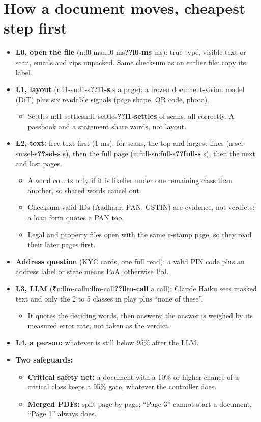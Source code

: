\documentclass[9pt]{extarticle}
\newcommand\N[1]{\ifcsname n:#1\endcsname\csname n:#1\endcsname\else\textbf{??#1}\fi}
\newcommand\R{₹}
\newcommand\lab[1]{\textcolor{norange}{\textbf{#1}}}
\begin{document}
\section{How a document moves, cheapest step first}
\begin{itemize}
\item \textbf{L0, open the file} (\N{l0-ms} ms): true type, visible text or scan, emails and zips unpacked. Same checksum as an earlier file: copy its label.
\item \textbf{L1, layout} (\N{l1-s} s a page): a frozen document-vision model (DiT) plus six readable signals (page shape, QR code, photo).
  \begin{itemize}
  \item Settles \N{l1-settles} of scans, all correctly. A passbook and a statement share words, not layout.
  \end{itemize}
\item \textbf{L2, text:} free text first (1 ms); for scans, the top and largest lines (\N{sel-s} s), then the full page (\N{full-s} s), then the next and last pages.
  \begin{itemize}
  \item A word counts only if it is likelier under one remaining class than another, so shared words cancel out.
  \item Checksum-valid IDs (Aadhaar, PAN, GSTIN) are evidence, not verdicts: a loan form quotes a PAN too.
  \item Legal and property files open with the same e-stamp page, so they read their later pages first.
  \end{itemize}
\item \textbf{Address question} (KYC cards, one full read): a valid PIN code plus an address label or state means PoA, otherwise PoI.
\item \textbf{L3, LLM} (\R\N{llm-call} a call): Claude Haiku sees masked text and only the 2 to 5 classes in play plus ``none of these''.
  \begin{itemize}
  \item It quotes the deciding words, then answers; the answer is weighed by its measured error rate, not taken as the verdict.
  \end{itemize}
\item \textbf{L4, a person:} whatever is still below 95\% after the LLM.
\item \textbf{Two safeguards:}
  \begin{itemize}
  \item \lab{Critical safety net:} a document with a 10\% or higher chance of a critical class keeps a 95\% gate, whatever the controller does.
  \item \lab{Merged PDFs:} split page by page; ``Page 3'' cannot start a document, ``Page 1'' always does.
  \end{itemize}
\end{itemize}
\end{document}
